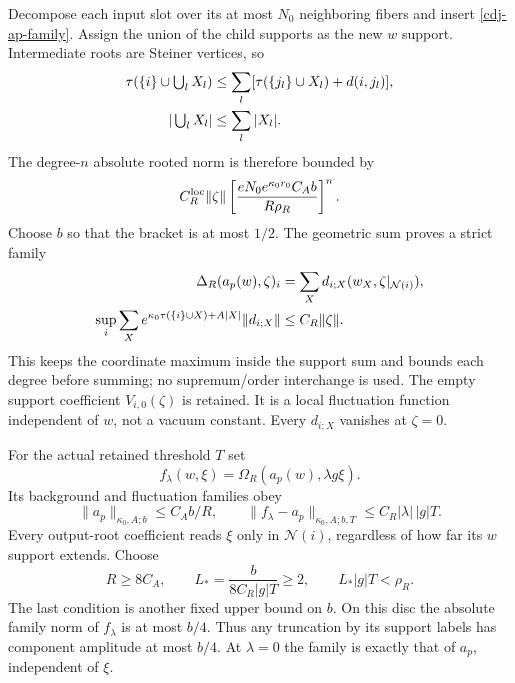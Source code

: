 \documentclass[11pt]{article}
\theoremstyle{remark}
\begin{document}
Decompose each input slot over its at most $N_0$ neighboring
fibers and insert \eqref{cdj-ap-family}. Assign the union
of the child supports as the new $w$ support. Intermediate
roots are Steiner vertices, so
\begin{align}
 \tau(\{i\}\cup\textstyle\bigcup_lX_l)
 &\le\sum_l[\tau(\{j_l\}\cup X_l)+d(i,j_l)],\notag\\
 |\textstyle\bigcup_lX_l|&\le\sum_l|X_l|.                \label{cdj-union}
\end{align}
The degree-$n$ absolute rooted norm is therefore bounded by
\begin{equation}\label{cdj-degree-majorant}
 C_R^{\rm loc}\|\zeta\|
 \left[
  \frac{eN_0e^{\kappa_0r_0}C_A b}{R\rho_R}
 \right]^n.
\end{equation}
Choose $b$ so that the bracket is at most $1/2$.
The geometric sum proves a strict family
\begin{align}
 \Delta_R(a_p(w),\zeta)_i
   &=\sum_Xd_{i;X}(w_X,\zeta|_{\mathcal N(i)}),\notag\\
 \sup_i\sum_Xe^{\kappa_0\tau(\{i\}\cup X)+A|X|}
                        \|d_{i;X}\|
   &\le C_R\|\zeta\|.                                  \label{cdj-joint-family}
\end{align}
This keeps the coordinate maximum inside the support sum
and bounds each degree before summing; no supremum/order
interchange is used. The empty support coefficient
$V_{i,0}(\zeta)$ is retained. It is a local fluctuation
function independent of $w$, not a vacuum constant.
Every $d_{i;X}$ vanishes at $\zeta=0$.

For the actual retained threshold $T$ set
\begin{equation}\label{cdj-lambda-field}
 f_\lambda(w,\xi)=\Omega_R(a_p(w),\lambda g\xi).
\end{equation}
Its background and fluctuation families obey
\begin{equation}\label{cdj-full-family}
 \|a_p\|_{\kappa_0,A;b}\le C_A b/R,\qquad
 \|f_\lambda-a_p\|_{\kappa_0,A;b,T}
                      \le C_R|\lambda|\,|g|T.
\end{equation}
Every output-root coefficient reads $\xi$ only in
$\mathcal N(i)$, regardless of how far its $w$ support
extends. Choose
\begin{equation}\label{cdj-lambda-radius}
 R\ge8C_A,\qquad
 L_*=\frac{b}{8C_R|g|T}\ge2,\qquad L_*|g|T<\rho_R.
\end{equation}
The last condition is another fixed upper bound on $b$.
On this disc the absolute family norm of $f_\lambda$ is
at most $b/4$. Thus any truncation by its support labels
has component amplitude at most $b/4$. At $\lambda=0$
the family is exactly that of $a_p$, independent of $\xi$.
\end{document}
